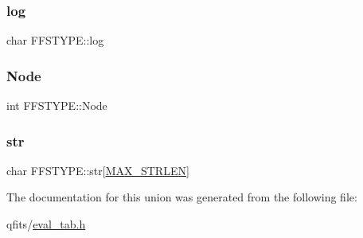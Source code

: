 \mbox{\label{union_f_f_s_t_y_p_e_adac2b43ce6df7346a04a0891dfed10d6}} 
\subsubsection{\texorpdfstring{log}{log}}
{\footnotesize\ttfamily char F\+F\+S\+T\+Y\+P\+E\+::log}

\mbox{\label{union_f_f_s_t_y_p_e_a533544a453ecac4b6e2eae93ee87379b}} 
\subsubsection{\texorpdfstring{Node}{Node}}
{\footnotesize\ttfamily int F\+F\+S\+T\+Y\+P\+E\+::\+Node}

\mbox{\label{union_f_f_s_t_y_p_e_a8c253ac04ed3f5801a03183359b82c92}} 
\subsubsection{\texorpdfstring{str}{str}}
{\footnotesize\ttfamily char F\+F\+S\+T\+Y\+P\+E\+::str\mbox{[}\hyperlink{eval__defs_8h_ae381522e1d10c3730b356f1ac5d2dccb}{M\+A\+X\+\_\+\+S\+T\+R\+L\+EN}\mbox{]}}



The documentation for this union was generated from the following file\+:\begin{DoxyCompactItemize}
\item 
qfits/\hyperlink{eval__tab_8h}{eval\+\_\+tab.\+h}\end{DoxyCompactItemize}
